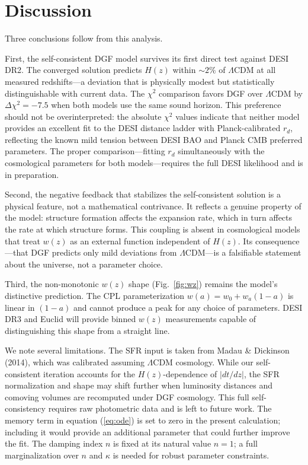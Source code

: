 \documentclass[12pt,a4paper]{article}
\begin{document}
\section*{Discussion}

Three conclusions follow from this analysis.

First, the self-consistent DGF model survives its first direct test against DESI DR2. The converged solution predicts $H(z)$ within $\sim2\%$ of $\Lambda$CDM at all measured redshifts---a deviation that is physically modest but statistically distinguishable with current data. The $\chi^2$ comparison favors DGF over $\Lambda$CDM by $\Delta\chi^2=-7.5$ when both models use the same sound horizon. This preference should not be overinterpreted: the absolute $\chi^2$ values indicate that neither model provides an excellent fit to the DESI distance ladder with Planck-calibrated $r_d$, reflecting the known mild tension between DESI BAO and Planck CMB preferred parameters. The proper comparison---fitting $r_d$ simultaneously with the cosmological parameters for both models---requires the full DESI likelihood and is in preparation.

Second, the negative feedback that stabilizes the self-consistent solution is a physical feature, not a mathematical contrivance. It reflects a genuine property of the model: structure formation affects the expansion rate, which in turn affects the rate at which structure forms. This coupling is absent in cosmological models that treat $w(z)$ as an external function independent of $H(z)$. Its consequence---that DGF predicts only mild deviations from $\Lambda$CDM---is a falsifiable statement about the universe, not a parameter choice.

Third, the non-monotonic $w(z)$ shape (Fig.~\ref{fig:wz}) remains the model's distinctive prediction. The CPL parameterization $w(a)=w_0+w_a(1-a)$ is linear in $(1-a)$ and cannot produce a peak for any choice of parameters. DESI DR3 and Euclid will provide binned $w(z)$ measurements capable of distinguishing this shape from a straight line.

We note several limitations. The SFR input is taken from Madau \& Dickinson (2014), which was calibrated assuming $\Lambda$CDM cosmology. While our self-consistent iteration accounts for the $H(z)$-dependence of $|dt/dz|$, the SFR normalization and shape may shift further when luminosity distances and comoving volumes are recomputed under DGF cosmology. This full self-consistency requires raw photometric data and is left to future work. The memory term in equation (\ref{eq:ode}) is set to zero in the present calculation; including it would provide an additional parameter that could further improve the fit. The damping index $n$ is fixed at its natural value $n=1$; a full marginalization over $n$ and $\kappa$ is needed for robust parameter constraints.
\end{document}
